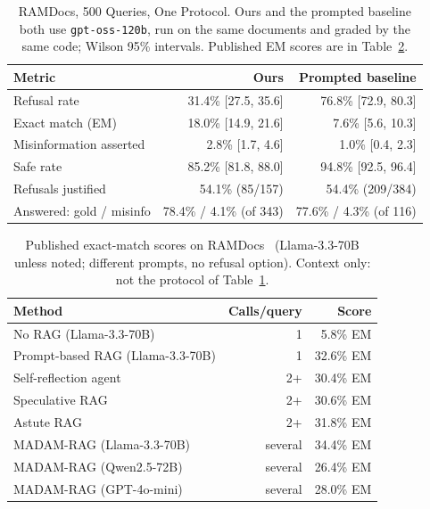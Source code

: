 \documentclass[conference]{IEEEtran}
\begin{document}
\begin{table}[htbp]
\caption{RAMDocs, 500 Queries, One Protocol. Ours and the prompted baseline
both use \texttt{gpt-oss-120b}, run on the same documents and graded by the
same code; Wilson 95\% intervals. Published EM scores are in
Table~\ref{tab:ramdocs_published}.}
\label{tab:ramdocs_main}
\centering
\footnotesize
\begin{tabularx}{\columnwidth}{@{}X r r@{}}
\toprule
Metric & Ours & Prompted baseline \\
\midrule
Refusal rate              & 31.4\% [27.5, 35.6] & 76.8\% [72.9, 80.3] \\
Exact match (EM)          & 18.0\% [14.9, 21.6] & 7.6\% [5.6, 10.3] \\
Misinformation asserted   & 2.8\% [1.7, 4.6]    & 1.0\% [0.4, 2.3] \\
Safe rate                 & 85.2\% [81.8, 88.0] & 94.8\% [92.5, 96.4] \\
Refusals justified        & 54.1\% (85/157)     & 54.4\% (209/384) \\
Answered: gold / misinfo  & 78.4\% / 4.1\% (of 343) & 77.6\% / 4.3\% (of 116) \\
\bottomrule
\end{tabularx}
\end{table}

\begin{table}[htbp]
\caption{Published exact-match scores on RAMDocs~\cite{wang2025ramdocs}
(Llama-3.3-70B unless noted; different prompts, no refusal option). Context
only: not the protocol of Table~\ref{tab:ramdocs_main}.}
\label{tab:ramdocs_published}
\centering
\small
\begin{tabularx}{\columnwidth}{@{}X r r@{}}
\toprule
Method & Calls/query & Score \\
\midrule
No RAG (Llama-3.3-70B)        & 1     & 5.8\% EM \\
Prompt-based RAG (Llama-3.3-70B) & 1  & 32.6\% EM \\
Self-reflection agent          & 2+    & 30.4\% EM \\
Speculative RAG                & 2+    & 30.6\% EM \\
Astute RAG                     & 2+    & 31.8\% EM \\
MADAM-RAG (Llama-3.3-70B)      & several & 34.4\% EM \\
MADAM-RAG (Qwen2.5-72B)        & several & 26.4\% EM \\
MADAM-RAG (GPT-4o-mini)        & several & 28.0\% EM \\
\bottomrule
\end{tabularx}
\end{table}
\end{document}
